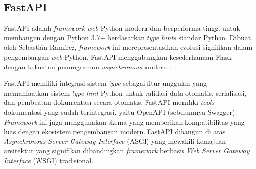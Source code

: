 \subsection{FastAPI}
\label{subsec:fastapi}

FastAPI adalah \emph{framework} \emph{web} Python modern dan berperforma tinggi untuk membangun \api{} dengan Python 3.7+ berdasarkan \emph{type hints} standar Python. Dibuat oleh Sebastián Ramírez, \emph{framework} ini merepresentasikan evolusi signifikan dalam pengembangan \emph{web} Python. FastAPI menggabungkan kesederhanaan Flask dengan kekuatan pemrograman \emph{asynchronous} modern \parencite{ramirez2020fastapi}.

FastAPI memiliki integrasi sistem \emph{type} sebagai fitur unggulan yang memanfaatkan sistem \emph{type hint} Python untuk validasi data otomatis, serialisasi, dan pembuatan dokumentasi secara otomatis. FastAPI memiliki \emph{tools} dokumentasi yang sudah terintegrasi, yaitu OpenAPI (sebelumnya Swagger). \emph{Framework} ini juga menggunakan skema \json yang memberikan kompatibilitas yang luas dengan ekosistem pengembangan modern. FastAPI dibangun di atas \emph{Asynchronous Server Gateway Interface} (ASGI) yang mewakili kemajuan arsitektur yang signifikan dibandingkan \emph{framework} berbasis \emph{Web Server Gateway Interface} (WSGI) tradisional. 




